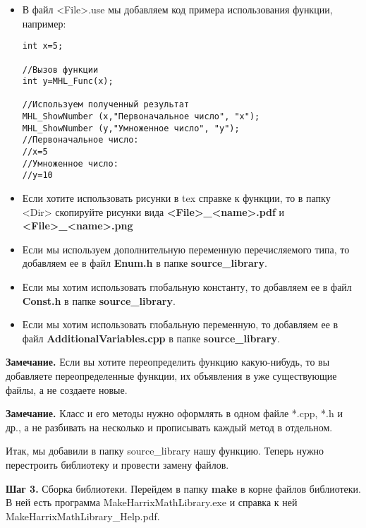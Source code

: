 \begin{itemize}
\begin{lstlisting}[label=examplefiletex, caption=Содержимое MHL\_Func.tex]
 x --- входной параметр.

\textbf{Возвращаемое значение:}
Число умноженное на 2.
\end{lstlisting}

\item В файл <File>.use мы добавляем код примера использования функции, например:
\begin{lstlisting}[label=examplefileuse, caption=Содержимое MHL\_Func.use]
int x=5;

//Вызов функции
int y=MHL_Func(x);

//Используем полученный результат
MHL_ShowNumber (x,"Первоначальное число", "x");
MHL_ShowNumber (y,"Умноженное число", "y");
//Первоначальное число:
//x=5
//Умноженное число:
//y=10
\end{lstlisting}

\item Если хотите использовать рисунки в tex справке к функции, то в папку <Dir> скопируйте рисунки вида  \textbf{<File>\_<name>.pdf} и \textbf{<File>\_<name>.png}

\item Если мы используем дополнительную переменную перечисляемого типа, то добавляем ее в файл \textbf{Enum.h} в папке \textbf{source\_library}.

\item Если мы хотим использовать глобальную константу, то добавляем ее в файл \textbf{Const.h} в папке \textbf{source\_library}.

\item Если мы хотим использовать глобальную переменную, то добавляем ее в файл \textbf{AdditionalVariables.cpp} в папке \textbf{source\_library}.

\end{itemize}

\textbf{Замечание.} Если вы хотите переопределить функцию какую-нибудь, то вы добавляете переопределенные функции, их объявления в уже существующие файлы, а не создаете новые.

\textbf{Замечание.} Класс и его методы нужно оформлять в одном файле *.cpp, *.h и др., а не разбивать на несколько и прописывать каждый метод в отдельном.

Итак, мы добавили в папку source\_library нашу функцию. Теперь нужно перестроить библиотеку и провести замену файлов.

\textbf{Шаг 3.}\label{step3} Сборка библиотеки. Перейдем в папку \textbf{make} в корне файлов библиотеки. В ней есть программа MakeHarrixMathLibrary.exe и справка к ней MakeHarrixMathLibrary\_Help.pdf. 


